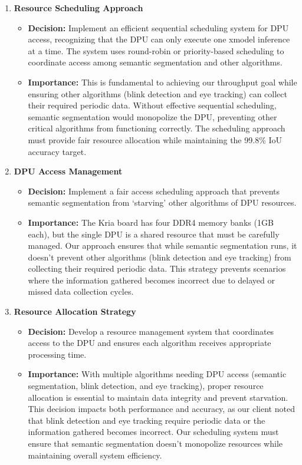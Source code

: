 \begin{enumerate}
\item \textbf{Resource Scheduling Approach}
   \begin{itemize}
   \item \textbf{Decision:} Implement an efficient sequential scheduling system for DPU access, recognizing that the DPU can only execute one xmodel inference at a time. The system uses round-robin or priority-based scheduling to coordinate access among semantic segmentation and other algorithms.
   \item \textbf{Importance:} This is fundamental to achieving our throughput goal while ensuring other algorithms (blink detection and eye tracking) can collect their required periodic data. Without effective sequential scheduling, semantic segmentation would monopolize the DPU, preventing other critical algorithms from functioning correctly. The scheduling approach must provide fair resource allocation while maintaining the 99.8\% IoU accuracy target.
   \end{itemize}

\item \textbf{DPU Access Management}
   \begin{itemize}
   \item \textbf{Decision:} Implement a fair access scheduling approach that prevents semantic segmentation from `starving' other algorithms of DPU resources.
   \item \textbf{Importance:} The Kria board has four DDR4 memory banks (1GB each), but the single DPU is a shared resource that must be carefully managed. Our approach ensures that while semantic segmentation runs, it doesn't prevent other algorithms (blink detection and eye tracking) from collecting their required periodic data. This strategy prevents scenarios where the information gathered becomes incorrect due to delayed or missed data collection cycles.
   \end{itemize}

\item \textbf{Resource Allocation Strategy}
   \begin{itemize}
   \item \textbf{Decision:} Develop a resource management system that coordinates access to the DPU and ensures each algorithm receives appropriate processing time.
   \item \textbf{Importance:} With multiple algorithms needing DPU access (semantic segmentation, blink detection, and eye tracking), proper resource allocation is essential to maintain data integrity and prevent starvation. This decision impacts both performance and accuracy, as our client noted that blink detection and eye tracking require periodic data or the information gathered becomes incorrect. Our scheduling system must ensure that semantic segmentation doesn't monopolize resources while maintaining overall system efficiency.
   \end{itemize}


\end{enumerate}
